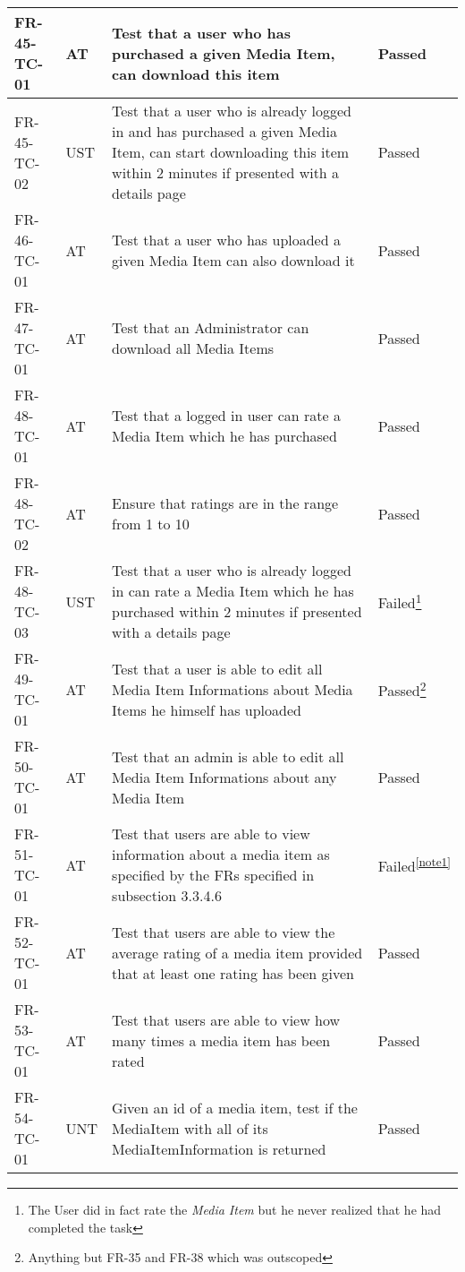 \documentclass[../report.tex]{subfiles}
\newcommand{\footnoteref}[1]{\textsuperscript{\ref{#1}}}
\begin{document}
\begin{longtable}{|L{2.1cm}|L{0.8cm}|L{9cm}|L{1.2cm}|}
FR-45-TC-01&AT&Test that a user who has purchased a given Media Item, can download this item&Passed  \\ \hline
FR-45-TC-02&UST&Test that a user who is already logged in and has purchased a given Media Item, can start downloading this item within 2 minutes if presented with a details page&Passed  \\ \hline
FR-46-TC-01&AT&Test that a user who has uploaded a given Media Item can also download it&Passed  \\ \hline
FR-47-TC-01&AT&Test that an Administrator can download all Media Items&Passed  \\ \hline
FR-48-TC-01&AT&Test that a logged in user can rate a Media Item which he has purchased&Passed  \\ \hline
FR-48-TC-02&AT&Ensure that ratings are in the range from 1 to 10&Passed  \\ \hline
FR-48-TC-03&UST&Test that a user who is already logged in can rate a Media Item which he has purchased within 2 minutes if presented with a details page&Failed\footnote{The User did in fact rate the \textit{Media Item} but he never realized that he had completed the task}  \\ \hline
FR-49-TC-01&AT&Test that a user is able to edit all Media Item Informations about Media Items he himself has uploaded&Passed\footnote{Anything but FR-35 and FR-38 which was outscoped}  \\ \hline
FR-50-TC-01&AT&Test that an admin is able to edit all Media Item Informations about any Media Item&Passed  \\ \hline
FR-51-TC-01&AT&Test that users are able to view information about a media item as specified by the FRs specified in subsection 3.3.4.6&Failed\footnoteref{note1}  \\ \hline
FR-52-TC-01&AT&Test that users are able to view the average rating of a media item provided that at least one rating has been given&Passed  \\ \hline
FR-53-TC-01&AT&Test that users are able to view how many times a media item has been rated&Passed  \\ \hline
FR-54-TC-01&UNT&Given an id of a media item, test if the MediaItem with all of its MediaItemInformation is returned&Passed  \\ \hline

\end{longtable}
\end{document}
